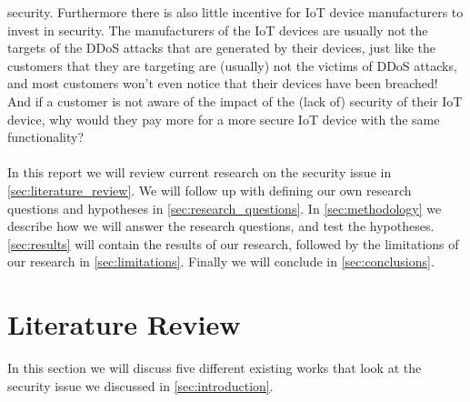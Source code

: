 \documentclass[a4paper,10pt]{article}
\begin{document}
security. Furthermore there is also little incentive for IoT device manufacturers to invest in security. The manufacturers 
of the IoT devices are usually not the targets of the DDoS attacks that are generated by their devices, just like the 
customers that they are targeting are (usually) not the victims of DDoS attacks, and most customers won't even notice
that their devices have been breached! And if a customer is not aware of the impact of the (lack of) security of their IoT device,
why would they pay more for a more secure IoT device with the same functionality?
\\\\
In this report we will review current research on the security issue in \autoref{sec:literature_review}. We will follow up with
defining our own research questions and hypotheses in \autoref{sec:research_questions}. In \autoref{sec:methodology} we
describe how we will answer the research questions, and test the hypotheses. \autoref{sec:results} will contain the results
of our research, followed by the limitations of our research in \autoref{sec:limitations}. Finally we will conclude in 
\autoref{sec:conclusions}.

\section{Literature Review} \label{sec:literature_review}
% 
In this section we will discuss five different existing works that look at the security issue we discussed in 
\autoref{sec:introduction}. 
\end{document}
